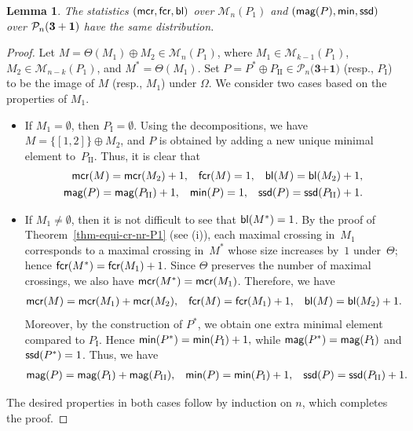 \documentclass[11pt]{article}
\DeclareMathOperator{\bl}{\mbox{\sf{bl}}}
\DeclareMathOperator{\mcr}{\mbox{\sf{mcr}}}
\DeclareMathOperator{\magg}{\mbox{\sf{mag}}}
\DeclareMathOperator{\minn}{\mbox{\sf{min}}}
\DeclareMathOperator{\ssd}{\mbox{\sf{ssd}}}
\DeclareMathOperator{\fcr}{\mbox{\sf{fcr}}}
\newtheorem{lem}[thm]{Lemma}
\newcommand{\PP}{{\mathcal P}}
\newcommand{\M}{\mathcal{M}}
\begin{document}
	
	\begin{lem}\label{lem-P1-3+1}
		The statistics $(\mcr, \fcr, \bl)$ over $\M_n(P_1)$ and $(\magg(P), \minn, \ssd)$ over $\PP_n\bf{(3+1)}$ have the same distribution.
	\end{lem}
	\begin{proof}
		Let $M=\Theta(M_1) \oplus M_2 \in \mathcal{M}_n(P_1)$, where $M_1 \in \M_{k-1}(P_1)$, $M_2\in \M_{n-k}(P_1)$, and $M^*=\Theta(M_1)$. Set
		$
		P=P^{*}\oplus P_{\text{II}}\in\PP_{n}\textbf{(3+1)}$ (resp., $P_{\text{I}}$)
		to be the image of $M$ (resp., $M_1$) under $\Omega$. We consider two cases based on the properties of $M_1$.
		\begin{itemize}
			\item If $M_1=\emptyset$, then $P_{\text{I}}=\emptyset$. 
			Using the decompositions, we have  
			$M=\{[1,2]\}\oplus M_{2}$, and
			$P$ is obtained by adding a new unique minimal element to~$P_{\text{II}}$.
			Thus, it is clear that
			\begin{align}\label{sta-P1-case1}
				\mcr(M)= \mcr(M_2)+1, \hspace{0.3cm} \fcr(M)=1, \hspace{0.3cm}\bl(M)= \bl(M_2)+1,\notag \\ 
				\magg(P)=\magg(P_{\text{II}})+1, \hspace{0.3cm} \minn(P)=1, \hspace{0.3cm} \ssd(P)= \ssd(P_{\text{II}})+1.
			\end{align}
			
			\item If $M_1 \neq \emptyset$, then it is not difficult to see that $\bl(M^*)= 1$.
			By the proof of Theorem~\ref{thm-equi-cr-nr-P1} (see (i)), each maximal crossing in~$M_{1}$ corresponds to a maximal crossing in~$M^{*}$ whose size increases by~$1$ under~$\Theta$; hence
			$\fcr(M^{*}) = \fcr(M_{1}) + 1$.
			Since $\Theta$ preserves the number of maximal crossings, we also have
			$\mcr(M^{*}) = \mcr(M_{1})$.
			Therefore, we have
			\begin{align}\label{sta-P1-case2}
				\mcr(M)= \mcr(M_1)+\mcr(M_2), \hspace{0.3cm}  \fcr(M)=\fcr(M_1)+1, \hspace{0.3cm} \bl(M)=\bl(M_2)+1.
			\end{align}
			Moreover, by the construction of $P^{*}$, we obtain one extra minimal element compared to $P_{\text{I}}$. Hence
			$
			\minn(P^{*}) = \minn(P_{\text{I}}) + 1,
			$
			while
			$
			\magg(P^{*}) = \magg(P_{\text{I}})$ and
			$\ssd(P^{*}) = 1$.
			Thus, we have
			\begin{align*}
				\magg(P)= \magg(P_{\text{I}})+\magg(P_{\text{II}}), \hspace{0.3cm}  \minn(P)=\minn(P_{\text{I}})+1, \hspace{0.3cm} \ssd(P)=\ssd(P_{\text{II}})+1.
			\end{align*}
		\end{itemize}
		The desired properties in both cases follow by induction on $n$, which completes the proof.
	\end{proof}
	
\end{document}
